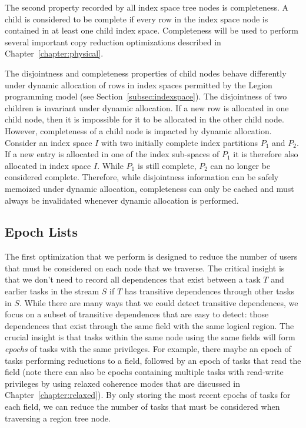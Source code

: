 The second property recorded by all index space tree
nodes is completeness. A child is considered to be
complete if every row in the index space node is 
contained in at least one child index space. Completeness
will be used to perform several important copy reduction
optimizations described in Chapter~\ref{chapter:physical}.

The disjointness and completeness properties of child 
nodes behave differently under dynamic allocation of
rows in index spaces permitted by the Legion programming
model (see Section~\ref{subsec:indexspace}). The disjointness
of two children is invariant under dynamic allocation.
If a new row is allocated in one child node, then it is
impossible for it to be allocated in the other child
node.  However, completeness of a child node is impacted
by dynamic allocation.  Consider an index space $I$ with
two initially complete index partitions $P_1$ and $P_2$.  
If a new entry is allocated in one of the index sub-spaces 
of $P_1$ it is therefore also allocated in index space $I$.
While $P_1$ is still complete, $P_2$ can no longer be 
considered complete. Therefore, while disjointness information
can be safely memoized under dynamic allocation, completeness
can only be cached and must always be invalidated whenever
dynamic allocation is performed.

\subsection{Epoch Lists}
\label{subsec:epochlists}
The first optimization that we perform is
designed to reduce the number of users that 
must be considered on each node that we 
traverse. The critical insight is that we
don't need to record all dependences that
exist between a task $T$ and earlier tasks
in the stream $S$ if $T$ has transitive
dependences through other tasks in $S$.
While there are many ways that we could detect
transitive dependences, we focus on a subset
of transitive dependences that are easy
to detect: those dependences that exist
through the same field with the same 
logical region. The crucial insight
is that tasks within the same node using
the same fields will form {\em epochs}
of tasks with the same privileges.  For
example, there maybe an epoch of tasks 
performing reductions to a field, followed
by an epoch of tasks that read the field
(note there can also be epochs containing 
multiple tasks with read-write privileges 
by using relaxed coherence modes that 
are discussed in Chapter~\ref{chapter:relaxed}). 
By only storing the most recent epochs of
tasks for each field, we can reduce the
number of tasks that must be considered
when traversing a region tree node.

